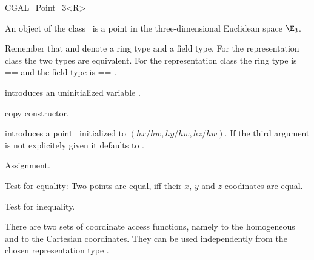 
\begin {classtemplate} {CGAL_Point_3<R>}

An object of the class \classname\ is a point in the three-dimensional
Euclidean space $\E_3$. 

Remember that  and  denote a ring type
and a field type. For the representation class
 the two types are equivalent. For the
representation class  the ring type is
 ==  and the field type is  == 
.

\creation
{}


\hidden {}
             {introduces an uninitialized variable \var.}

\hidden {}
 	    {copy constructor.}

            {introduces a point \var\ initialized to $(hx/hw,hy/hw, hz/hw)$.
             If the third argument is not explicitely given it defaults
             to .}


\operations
\threecolumns{5cm}{4cm}

\hidden {}
        {Assignment.}

       {Test for equality: Two points are equal, iff their $x$, $y$ and $z$
        coodinates are equal.}

       {Test for inequality.}



There are two sets of coordinate access functions, namely to the
homogeneous and to the Cartesian coordinates. They can be used
independently from the chosen representation type .


\end{classtemplate}
